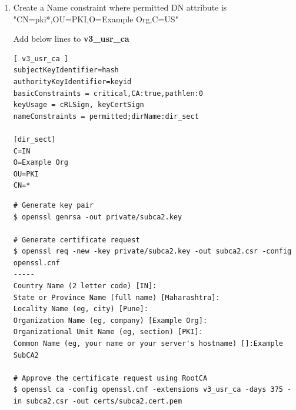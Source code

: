 \documentclass[12pt]{report}
\begin{document}
\begin{enumerate}[label*=\arabic*.]
\begin{lstlisting}
[alt_names]
DNS.1 = *.example.org
       \end{lstlisting}
       \begin{lstlisting}[style=bashInputStyle]
#Generate key pair
$ openssl genrsa -out private/server3.key

# Generate Certificate request
$ openssl req -new -key private/server3.key -out server3.csr -config openssl.cnf
-----
Country Name (2 letter code) [IN]:
State or Province Name (full name) [Maharashtra]:
Locality Name (eg, city) [Pune]:
Organization Name (eg, company) [Example Org]:
Organizational Unit Name (eg, section) [PKI]:
Common Name (eg, your name or your server's hostname) []:server3.example.org

# Approve the certificate request by RootCA signing the request
$ openssl ca -config openssl.cnf -extensions server_cert -days 375 -in server3.csr -out certs/server3.cert.pem 

# View the certificate
$ openssl x509 -in certs/server3.cert.pem -noout -text
       \end{lstlisting}

    \item Create a Name constraint where permitted DN attribute is "CN=pki*,OU=PKI,O=Example Org,C=US"

            Add below lines to \textbf{v3\_usr\_ca} 
            \begin{lstlisting}
[ v3_usr_ca ]
subjectKeyIdentifier=hash
authorityKeyIdentifier=keyid
basicConstraints = critical,CA:true,pathlen:0
keyUsage = cRLSign, keyCertSign
nameConstraints = permitted;dirName:dir_sect

[dir_sect]
C=IN
O=Example Org
OU=PKI
CN=*
            \end{lstlisting}
            \begin{lstlisting}[style=bashInputStyle]
# Generate key pair
$ openssl genrsa -out private/subca2.key

# Generate certificate request
$ openssl req -new -key private/subca2.key -out subca2.csr -config openssl.cnf
-----
Country Name (2 letter code) [IN]:
State or Province Name (full name) [Maharashtra]:
Locality Name (eg, city) [Pune]:
Organization Name (eg, company) [Example Org]:
Organizational Unit Name (eg, section) [PKI]:
Common Name (eg, your name or your server's hostname) []:Example SubCA2

# Approve the certificate request using RootCA
$ openssl ca -config openssl.cnf -extensions v3_usr_ca -days 375 -in subca2.csr -out certs/subca2.cert.pem


\end{lstlisting}
\end{enumerate}
\end{document}
